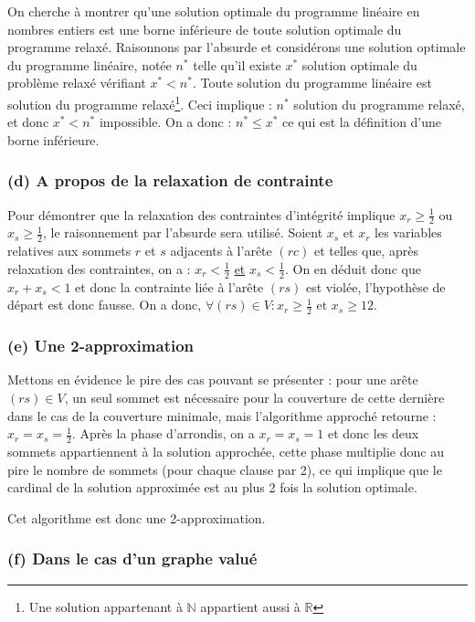 On cherche à montrer qu'une solution optimale du programme linéaire en nombres entiers est une borne
inférieure de toute solution optimale du programme relaxé. Raisonnons par l'absurde et considérons
une solution optimale du programme linéaire, notée $n^*$ telle qu'il existe $x^*$ solution optimale du problème
relaxé vérifiant $x^* < n^*$. Toute solution du programme linéaire est solution du programme
relaxé\footnote{Une solution appartenant à $\mathbb{N}$ appartient aussi à $\mathbb{R}$}. Ceci
implique : $n^*$ solution du programme relaxé, et donc $x^* < n^*$ impossible. On a donc : $n^* \leq
x^*$ ce qui est la définition d'une borne inférieure.

\subsubsection{(d) A propos de la relaxation de contrainte}

Pour démontrer que la relaxation des contraintes d'intégrité implique $x_r \geq \frac{1}{2}$ ou $x_s
\geq \frac{1}{2}$, le raisonnement par l'absurde sera utilisé. 
Soient $x_s$ et $x_r$ les variables relatives aux sommets $r$ et $s$ adjacents à l'arête $(rc)$ et
telles que, après relaxation des contraintes, on a : $x_r < \frac{1}{2}$ \underline{et} $x_s <
\frac{1}{2}$. On en déduit donc que $x_r + x_s < 1$ et donc la contrainte liée à l'arête $(rs)$ est
violée, l'hypothèse de départ est donc fausse. On a donc, $\forall (rs) \in V : x_r \geq \frac{1}{2}
\mbox{ et } x_s \geq{1}{2}$.

\subsubsection{(e) Une 2-approximation}

Mettons en évidence le pire des cas pouvant se présenter : pour une arête $(rs) \in V$, un seul
sommet est nécessaire pour la couverture de cette dernière dans le cas de la couverture minimale,
mais l'algorithme approché retourne : $x_r = x_s = \frac{1}{2}$. Après la phase d'arrondis, on a $x_r
= x_s = 1$ et donc les deux sommets appartiennent à la solution approchée, cette phase multiplie
donc au pire le nombre de sommets (pour chaque clause par 2), ce qui implique que le cardinal de la
solution approximée est au plus 2 fois la solution optimale.

Cet algorithme est donc une 2-approximation.

\subsubsection{(f) Dans le cas d'un graphe valué}
